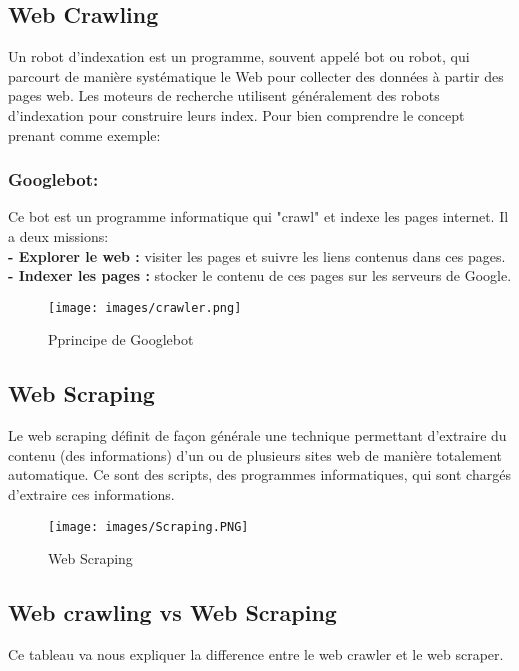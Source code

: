 \subsection{Web Crawling }
Un robot d'indexation \textbf{\cite{Crawler}} est un programme, souvent appelé bot ou robot, qui parcourt de manière systématique le Web pour collecter des données à partir des pages web. Les moteurs de recherche utilisent généralement des robots d'indexation pour construire leurs index.
Pour bien comprendre le concept prenant comme exemple:
\subsubsection{Googlebot:}
Ce bot est un programme informatique qui "crawl" et indexe les pages internet.
Il a deux missions:\\
\textbf{- Explorer le web :} visiter les pages et suivre les liens contenus dans ces pages.\\
\textbf{- Indexer les pages :} stocker le contenu de ces pages sur les serveurs de Google.

\begin{figure}[H]
    \centering
    \texttt{[image: images/crawler.png]}
    \caption{Pprincipe de Googlebot \cite{crawler}}
    \label{fig:Global}  
    \end{figure}
\subsection{Web Scraping }
Le web scraping \textbf{\cite{Scraper}} définit de façon générale une technique permettant d'extraire du contenu (des informations) d'un ou de plusieurs sites web de manière totalement automatique. Ce sont des scripts, des programmes informatiques, qui sont chargés d'extraire ces informations.

\begin{figure}[H]
    \centering
    \texttt{[image: images/Scraping.PNG]}
    \caption{Web Scraping \cite{scrape}}
    \label{fig:Global}  
    \end{figure}
\subsection{Web crawling vs Web Scraping}
Ce tableau va nous expliquer la difference entre le web crawler et le web scraper.

